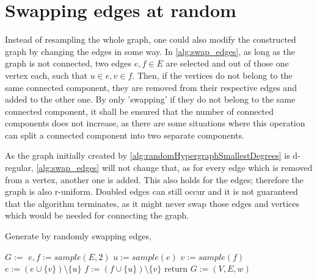 \section{Swapping edges at random}
Instead of resampling the whole graph, one could also modify the constructed graph by changing the edges in some way. In \cref{alg:swap_edges}, as long as the graph is not connected, two edges $e,f \in E$ are selected and out of those one vertex each, such that $u\in e, v\in f$. Then, if the vertices do not belong to the same connected component, they are removed from their respective edges and added to the other one. By only 'swapping' if they do not belong to the same connected component, it shall be ensured that the number of connected components does not increase, as there are some situations where this operation can split a connected component into two separate components.

As the graph initially created by \cref{alg:randomHypergraphSmallestDegrees} is d-regular, \cref{alg:swap_edges} will not change that, as for every edge which is removed from a vertex, another one is added. This also holds for the edges; therefore the graph is also r-uniform. Doubled edges can still occur and it is not guaranteed that the algorithm terminates, as it might never swap those edges and vertices which would be needed for connecting the graph.





	
\begin{algorithm}%
		\caption{Generate by randomly swapping edges, \label{alg:swap_edges}} 
		\begin{algorithmic}
			\State $G:=$ 
			\State $e,f := sample(E, 2)$
			\State $u := sample(e)$
			\State $v := sample(f)$
			\State $e := (e \cup \{v\}) \setminus \{u\}$
			\State $f := (f \cup \{u\}) \setminus \{v\}$
			\EndIf
			\EndWhile
			\State return $G:=(V,E, w)$	
			\EndFunction 
		\end{algorithmic}
	\end{algorithm}	
	
	
	
